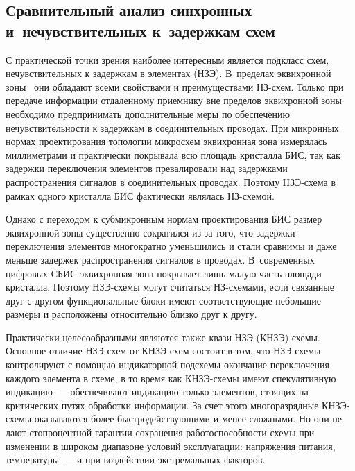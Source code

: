 \begin{multicols}{2}
\section{Сравнительный анализ синхронных и~нечувствительных к~задержкам схем}
       
       С практической точки зрения наиболее интересным является подкласс схем, 
нечувствительных к задержкам в элементах (НЗЭ). В~пределах эквихронной 
       зоны~\cite{28-sok} они обладают всеми свойствами и преимуществами НЗ-схем. 
Только при передаче информации отдаленному приемнику вне пределов эквихронной зоны 
необходимо предпринимать дополнительные меры по обеспечению нечувствительности к 
задержкам в соединительных проводах. При микронных нормах проектирования топологии 
микросхем эквихронная зона измерялась миллиметрами и практически покрывала всю 
площадь кристалла БИС, так как задержки переключения элементов превалировали над 
задержками распространения сигналов в соединительных проводах. Поэтому НЗЭ-схе\-ма в 
рамках одного кристалла БИС фактически являлась НЗ-схе\-мой.
       
       Однако с переходом к субмикронным нормам проектирования БИС размер 
эквихронной зоны существенно сократился из-за того, что задержки переключения 
элементов многократно уменьшились и стали сравнимы и даже меньше задержек 
распространения сигналов в проводах. В~современных цифровых СБИС эквихронная зона 
покрывает лишь малую часть площади кристалла. Поэтому НЗЭ-схе\-мы могут считаться 
       НЗ-схе\-ма\-ми, если связанные друг с другом функциональные блоки имеют 
соответствующие небольшие размеры и расположены относительно близко друг к другу.
       
       Практически целесообразными являются также ква\-зи-НЗЭ (КНЗЭ) схе\-мы. 
Основное отличие НЗЭ-схем от КНЗЭ-схем состоит в том, что НЗЭ-схе\-мы контролируют с 
помощью индикаторной подсхемы окончание переключения каждого элемента в схеме, в то 
время как КНЗЭ-схе\-мы имеют спекулятивную индикацию~--- обеспечивают индикацию 
только элементов, стоящих на критических путях\linebreak
 обработки информации. За счет этого 
многоразрядные КНЗЭ-схе\-мы оказываются более быст\-ро\-дей\-ст\-ву\-ющи\-ми и менее 
сложными. Но они не \mbox{дают} стопроцентной гарантии сохранения работоспособности схемы 
при изменении в широком диапазоне условий эксплуатации: напряжения питания, 
температуры~--- и при воздействии экстремальных факторов.
       

\end{multicols}
